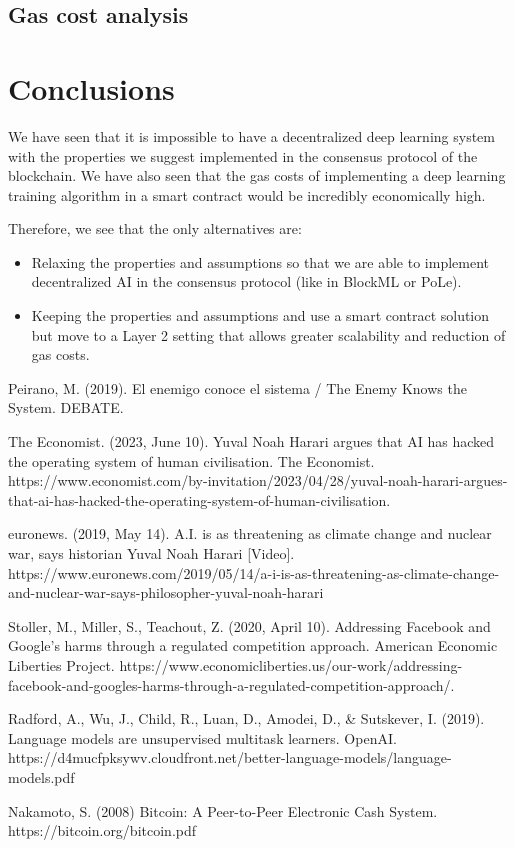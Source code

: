 \documentclass[conference]{IEEEtran}
\begin{document}
\subsection{Gas cost analysis}

\section{Conclusions}


We have seen that it is impossible to have a decentralized deep learning system with the properties we suggest implemented in the consensus protocol of the blockchain. We have also seen that the gas costs of implementing a deep learning training algorithm in a smart contract would be incredibly economically high.

Therefore, we see that the only alternatives are:
\begin{itemize}
\item Relaxing the properties and assumptions so that we are able to implement decentralized AI in the consensus protocol (like in BlockML or PoLe).
\item Keeping the properties and assumptions and use a smart contract solution but move to a Layer 2 setting that allows greater scalability and reduction of gas costs.
\end{itemize}

\begin{thebibliography}{00}

 Peirano, M. (2019). El enemigo conoce el sistema / The Enemy Knows the System. DEBATE.

 The Economist. (2023, June 10). Yuval Noah Harari argues that AI has hacked the operating system of human civilisation. The Economist. https://www.economist.com/by-invitation/2023/04/28/yuval-noah-harari-argues-that-ai-has-hacked-the-operating-system-of-human-civilisation.

 euronews. (2019, May 14). A.I. is as threatening as climate change and nuclear war, says historian Yuval Noah Harari [Video]. https://www.euronews.com/2019/05/14/a-i-is-as-threatening-as-climate-change-and-nuclear-war-says-philosopher-yuval-noah-harari

 Stoller, M., Miller, S., Teachout, Z. (2020, April 10). Addressing Facebook and Google’s harms through a regulated competition approach. American Economic Liberties Project. https://www.economicliberties.us/our-work/addressing-facebook-and-googles-harms-through-a-regulated-competition-approach/.

 Radford, A., Wu, J., Child, R., Luan, D., Amodei, D., \& Sutskever, I. (2019). Language models are unsupervised multitask learners. OpenAI. https://d4mucfpksywv.cloudfront.net/better-language-models/language-models.pdf

 Nakamoto, S. (2008) Bitcoin: A Peer-to-Peer Electronic Cash System. https://bitcoin.org/bitcoin.pdf

\end{thebibliography}
\end{document}
